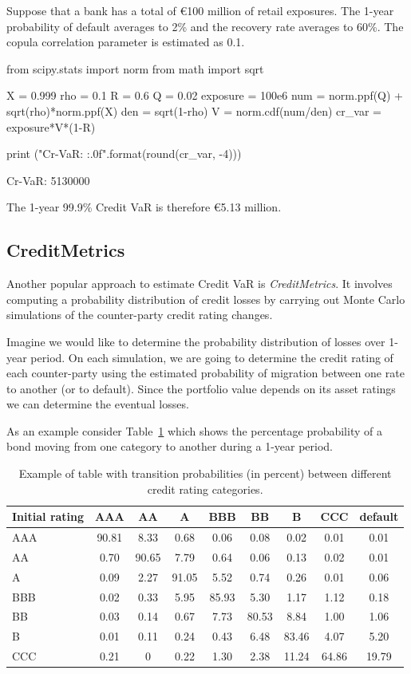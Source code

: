 Suppose that a bank has a total of \euro{100} million of retail exposures. The 1-year probability of default averages to 2\% and the recovery rate averages to 60\%. The copula correlation parameter is estimated as 0.1.

\begin{ipython}
from scipy.stats import norm
from math import sqrt

X = 0.999
rho = 0.1
R = 0.6
Q = 0.02
exposure = 100e6
num = norm.ppf(Q) + sqrt(rho)*norm.ppf(X)
den = sqrt(1-rho)
V = norm.cdf(num/den)
cr_var = exposure*V*(1-R)

print ("Cr-VaR: {:.0f}".format(round(cr_var, -4)))
\end{ipython}
\begin{ioutput}
Cr-VaR: 5130000
\end{ioutput}
\noindent
The 1-year 99.9\% Credit VaR is therefore \euro{5.13} million.

\subsection{CreditMetrics}
Another popular approach to estimate Credit VaR is \emph{CreditMetrics}. It involves computing a probability distribution of credit losses by carrying out Monte Carlo simulations of the counter-party credit rating changes.

Imagine we would like to determine the probability distribution of losses over 1-year period. On each simulation, we are going to determine the credit rating of each counter-party using the estimated probability of migration between one rate to another (or to default). Since the portfolio value depends on its asset ratings we can determine the eventual losses. 

As an example consider Table~\ref{tab:credit_ratings} which shows the percentage probability of a bond moving from one category to another during a 1-year period.

\begin{table}[htb]
\centering
\begin{tabular}{|l|c|c|c|c|c|c|c|c|}
\hline
Initial rating & AAA & AA & A & BBB & BB & B & CCC & default \\
\hline
\hline
AAA & 90.81 & 8.33 & 0.68 & 0.06 & 0.08 & 0.02 & 0.01& 0.01 \\ 
\hline
AA & 0.70 & 90.65 & 7.79 & 0.64 & 0.06 & 0.13 & 0.02 & 0.01 \\ 
\hline
A & 0.09 & 2.27 & 91.05 & 5.52 & 0.74 & 0.26 & 0.01 & 0.06 \\ 
\hline
BBB & 0.02 & 0.33 & 5.95 & 85.93 & 5.30 & 1.17 & 1.12 & 0.18 \\
\hline
BB & 0.03 & 0.14 & 0.67 & 7.73 & 80.53 & 8.84 & 1.00 & 1.06 \\
\hline
B & 0.01 & 0.11 & 0.24 & 0.43 & 6.48 & 83.46 & 4.07 & 5.20 \\
\hline
CCC & 0.21 & 0 & 0.22 & 1.30 & 2.38 & 11.24 & 64.86 & 19.79 \\		
\hline
\end{tabular}
\caption{Example of table with transition probabilities (in percent) between different credit rating categories.}
\label{tab:credit_ratings}
\end{table}


